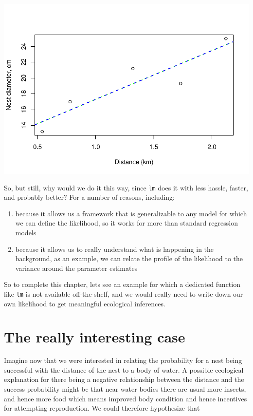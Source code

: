 \documentclass[
]{book}
\providecommand{\tightlist}{%
  \setlength{\itemsep}{0pt}\setlength{\parskip}{0pt}}
\begin{document}
\includegraphics{ECOMODbook_files/figure-latex/ch13.30.5-1.pdf}

So, but still, why would we do it this way, since \texttt{lm} does it with less hassle, faster, and probably better? For a number of reasons, including:

\begin{enumerate}
\def\labelenumi{\arabic{enumi}.}
\tightlist
\item
  because it allows us a framework that is generalizable to any model for which we can define the likelihood, so it works for more than standard regression models
\item
  because it allows us to really understand what is happening in the background, as an example, we can relate the profile of the likelihood to the variance around the parameter estimates
\end{enumerate}

So to complete this chapter, lets see an example for which a dedicated function like \texttt{lm} is not available off-the-shelf, and we would really need to write down our own likelihood to get meaningful ecological inferences.

\hypertarget{the-really-interesting-case}{%
\section{The really interesting case}\label{the-really-interesting-case}}

Imagine now that we were interested in relating the probability for a nest being successful with the distance of the nest to a body of water. A possible ecological explanation for there being a negative relationship between the distance and the success probability might be that near water bodies there are usual more insects, and hence more food which means improved body condition and hence incentives for attempting reproduction. We could therefore hypothesize that
\end{document}
